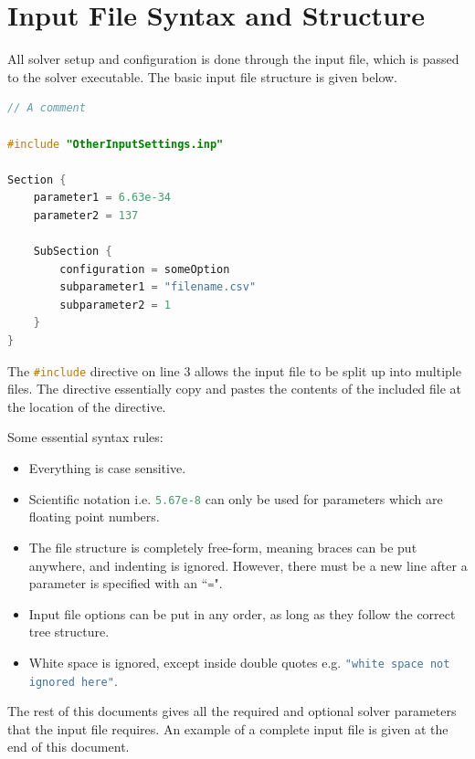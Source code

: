 \section*{Input File Syntax and Structure}
All solver setup and configuration is done through the input file, which is passed to the solver executable. The basic input file structure is given below.

\begin{lstlisting}[language=C++]
// A comment

#include "OtherInputSettings.inp"

Section {
    parameter1 = 6.63e-34
    parameter2 = 137

    SubSection {
        configuration = someOption
        subparameter1 = "filename.csv"
        subparameter2 = 1
    }
}
\end{lstlisting}

The \lstinline[language=C++]!#include! directive on line 3 allows the input file to be split up into multiple files. The directive essentially copy and pastes the contents of the included file at the location of the directive. 

Some essential syntax rules:
\begin{itemize}
    \item Everything is case sensitive.

    \item Scientific notation i.e. \lstinline[language=C++]!5.67e-8! can only be used for parameters which are floating point numbers.

    \item The file structure is completely free-form, meaning braces can be put anywhere, and indenting is ignored. However, there must be a new line after a parameter is specified with an ``\lstinline[language=C++]!=!".

    \item Input file options can be put in any order, as long as they follow the correct tree structure.

    \item White space is ignored, except inside double quotes e.g. \lstinline[language=C++]!"white space not ignored here"!.
\end{itemize}

The rest of this documents gives all the required and optional solver parameters that the input file requires. An example of a complete input file is given at the end of this document.


